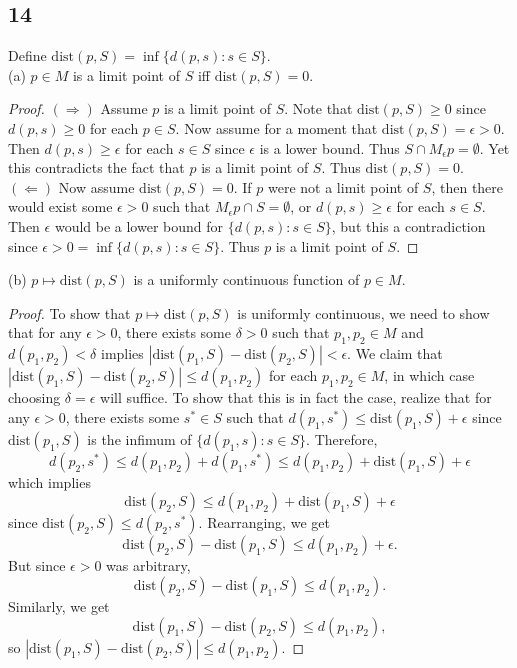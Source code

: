 \documentclass[11pt]{amsart}
\begin{document}
\subsection*{14} Define $\text{dist}(p,S) = \inf\{d(p,s):s\in S\}$. \\

(a) $p\in M$ is a limit point of $S$ iff $\text{dist}(p,S) = 0$.

\begin{proof}
  $(\Rightarrow)$ Assume $p$ is a limit point of $S$. Note that $\text{dist}(p,S)\geq 0$ since $d(p,s) \geq 0$ for each $p\in S$. Now assume for a moment that $\text{dist}(p,S) = \epsilon > 0$. Then $d(p,s) \geq \epsilon$ for each $s\in S$ since $\epsilon$ is a lower bound. Thus $S\cap M_{\epsilon}p = \emptyset$. Yet this contradicts the fact that $p$ is a limit point of $S$. Thus $\text{dist}(p,S) = 0$. \\
  $(\Leftarrow)$ Now assume $\text{dist}(p,S) = 0$. If $p$ were not a limit point of $S$, then there would exist some $\epsilon > 0$ such that $M_{\epsilon}p\cap S = \emptyset$, or $d(p,s)\geq \epsilon$ for each $s\in S$. Then $\epsilon$ would be a lower bound for $\{d(p,s):s\in S\}$, but this a contradiction since $\epsilon > 0 = \inf\{d(p,s) : s\in S\}$. Thus $p$ is a limit point of $S$.
\end{proof}

(b) $p \mapsto \text{dist}(p,S)$ is a uniformly continuous function of $p\in M$.

\begin{proof}
  To show that $p \mapsto \text{dist}(p,S)$ is uniformly continuous, we need to show that for any $\epsilon > 0$, there exists some $\delta > 0$ such that $p_{1},p_{2}\in M$ and $d(p_{1},p_{2}) < \delta$ implies $|\text{dist}(p_{1},S) - \text{dist}(p_{2},S)| < \epsilon$. We claim that $|\text{dist}(p_{1}, S) - \text{dist}(p_{2}, S)| \leq d(p_{1}, p_{2})$ for each $p_{1}, p_{2} \in M$, in which case choosing $\delta = \epsilon$ will suffice. To show that this is in fact the case, realize that for any $\epsilon > 0$, there exists some $s^{*}\in S$ such that $d(p_{1}, s^{*}) \leq \text{dist}(p_{1}, S) + \epsilon$ since $\text{dist}(p_{1}, S)$ is the infimum of $\{d(p_{1}, s) : s\in S\}$. Therefore,
  \[ d(p_{2}, s^{*}) \leq d(p_{1},p_{2}) + d(p_{1}, s^{*}) \leq d(p_{1},p_{2}) + \text{dist}(p_{1},S) + \epsilon \]
  which implies 
  \[ \text{dist}(p_{2},S) \leq d(p_{1},p_{2}) + \text{dist}(p_{1},S) + \epsilon \]
  since $\text{dist}(p_{2},S) \leq d(p_{2},s^{*})$. Rearranging, we get 
  \[ \text{dist}(p_{2}, S) - \text{dist}(p_{1},S) \leq d(p_{1}, p_{2}) + \epsilon. \]
  But since $\epsilon > 0$ was arbitrary, 
  \[ \text{dist}(p_{2}, S) - \text{dist}(p_{1}, S) \leq d(p_{1}, p_{2}). \]
  Similarly, we get 
  \[ \text{dist}(p_{1},S) - \text{dist}(p_{2}, S) \leq d(p_{1}, p_{2}), \]
  so $|\text{dist}(p_{1},S) - \text{dist}(p_{2},S)| \leq d(p_{1},p_{2})$.
\end{proof}
\end{document}
